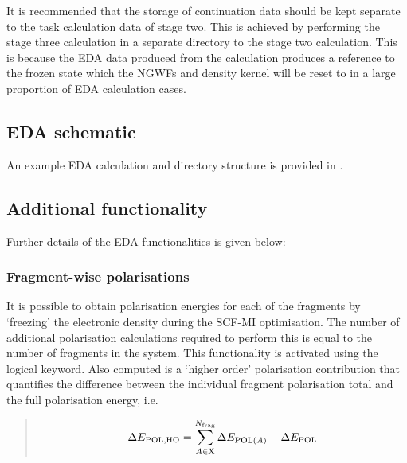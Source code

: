 \documentclass[letterpaper,10pt,english]{sphinxmanual}
\begin{document}
It is recommended that the storage of continuation data should be kept
separate to the  task calculation data of stage two.
This is achieved by performing the stage three calculation in a separate
directory to the stage two calculation. This is because the EDA data
produced from the  calculation produces a reference to
the frozen state which the NGWFs and density kernel will be reset to in
a large proportion of EDA calculation cases.


\subsection{EDA schematic}
\label{\detokenize{EDA:eda-schematic}}
An example EDA calculation and directory structure is provided in .


\subsection{Additional functionality}
\label{\detokenize{EDA:additional-functionality}}\label{\detokenize{EDA:exampleeda}}
Further details of the EDA functionalities is given below:


\subsubsection{Fragment-wise polarisations}
\label{\detokenize{EDA:fragment-wise-polarisations}}
\begin{DUlineblock}{0em}
\item[] 
\item[] It is possible to obtain polarisation energies for each of the
fragments by ‘freezing’ the electronic density during the SCF-MI
optimisation. The number of additional polarisation calculations
required to perform this is equal to the number of fragments in the
system. This functionality is activated using the
 logical keyword. Also computed is a ‘higher
order’ polarisation contribution that quantifies the difference
between the individual fragment polarisation total and the full
polarisation energy, i.e.
\end{DUlineblock}
\begin{quote}
\begin{equation*}
\begin{split}\begin{aligned}
 \Delta E_\textrm{POL,HO} = \sum_{A\in \textrm{X}}^{N_\textrm{frag}} \Delta E_\textrm{POL(\textit{A})} - \Delta E_\textrm{POL}\end{aligned}\end{split}
\end{equation*}\end{quote}
\end{document}
